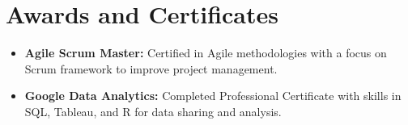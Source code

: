 \documentclass[a4paper,8pt]{article}
\begin{document}
\section{Awards and Certificates}
\begin{itemize}[nosep,after=\strut, leftmargin=1.5em]
    \item \textbf{Agile Scrum Master:} Certified in Agile methodologies with a focus on Scrum framework to improve project management.
    \item \textbf{Google Data Analytics:} Completed Professional Certificate with skills in SQL, Tableau, and R for data sharing and analysis.
\end{itemize}
\end{document}
